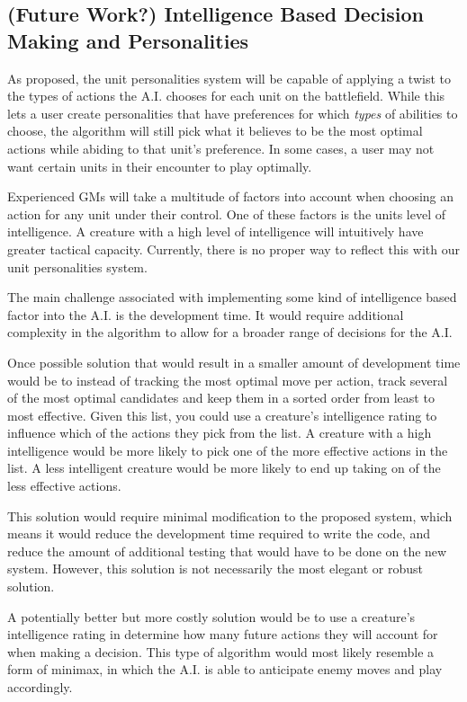 \documentclass[12pt,a4paper]{report}
\begin{document}
		\subsection{(Future Work?) Intelligence Based Decision Making and Personalities}
		As proposed, the unit personalities system will be capable of applying a twist to the types of actions the A.I. chooses for each unit on the battlefield. While this lets a user create personalities that have preferences for which \textit{types} of abilities to choose, the algorithm will still pick what it believes to be the most optimal actions while abiding to that unit's preference. In some cases, a user may not want certain units in their encounter to play optimally. 
		
		Experienced GMs will take a multitude of factors into account when choosing an action for any unit under their control. One of these factors is the units level of intelligence. A creature with a high level of intelligence will intuitively have greater tactical capacity. Currently, there is no proper way to reflect this with our unit personalities system. 
		
		The main challenge associated with implementing some kind of intelligence based factor into the A.I. is the development time. It would require additional complexity in the algorithm to allow for a broader range of decisions for the A.I. 
		
		Once possible solution that would result in a smaller amount of development time would be to instead of tracking the most optimal move per action, track several of the most optimal candidates and keep them in a sorted order from least to most effective. Given this list, you could use a creature's intelligence rating to influence which of the actions they pick from the list. A creature with a high intelligence would be more likely to pick one of the more effective actions in the list. A less intelligent creature would be more likely to end up taking on of the less effective actions.
		
		This solution would require minimal modification to the proposed system, which means it would reduce the development time required to write the code, and reduce the amount of additional testing that would have to be done on the new system. However, this solution is not necessarily the most elegant or robust solution. 
		
		
		A potentially better but more costly solution would be to use a creature's intelligence rating in determine how many future actions they will account for when making a decision. This type of algorithm would most likely resemble a form of minimax, in which the A.I. is able to anticipate enemy moves and play accordingly. 
		
\end{document}
